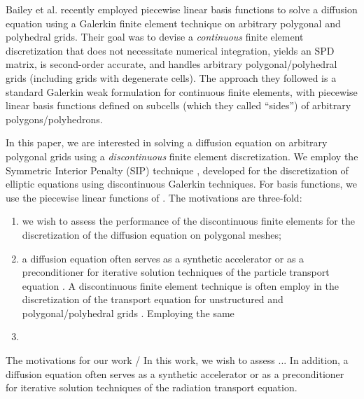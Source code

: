 \documentclass[preprint,10pt]{elsarticle}
\renewcommand{\(}{\left(}
\renewcommand{\)}{\right)}
\renewcommand{\[}{\left[}
\renewcommand{\]}{\right]}
\begin{document}
%
%
Bailey et al. \cite{BaileyAdams2008} recently employed piecewise linear basis
functions to solve a diffusion equation using a Galerkin finite element technique on 
arbitrary polygonal and polyhedral grids. Their goal was to devise a {\em continuous} finite 
element discretization that does not necessitate numerical integration, yields an SPD matrix, 
is second-order accurate, and handles arbitrary polygonal/polyhedral grids (including 
grids with degenerate cells). The approach they followed is a standard Galerkin weak 
formulation for continuous finite elements, with piecewise linear basis functions 
defined on subcells (which they called ``sides'') of arbitrary polygons/polyhedrons.

In this paper, we are interested in solving a diffusion equation on arbitrary polygonal
grids using a {\em discontinuous} finite element discretization. We employ the
Symmetric Interior Penalty (SIP) technique \cite{IPRefs}, developed for the discretization
of elliptic equations using discontinuous Galerkin techniques. For basis functions,
we use the piecewise linear functions of \cite{BaileyAdams2008}.
The motivations are three-fold: 
\begin{enumerate}
\item we wish to assess the performance of the discontinuous finite elements for 
the discretization of the diffusion equation on polygonal meshes;
\item a diffusion equation often serves as a synthetic accelerator or as a
preconditioner for iterative solution techniques of the particle transport equation
\cite{AdamsLarsen2002}. A discontinuous finite element technique is often employ
in the discretization of the transport equation for unstructured and 
polygonal/polyhedral grids \cite{MorelWarsaWareing,PWLD,CFEM-PWDL-Warsa,WangRagusa}.
Employing the same    
\item 
\end{enumerate}
The motivations for our work / In this work, we wish to assess ... In addition,
a diffusion equation often serves as a synthetic accelerator or as a
preconditioner \cite{AdamsLarsen2002} for iterative solution techniques of the 
radiation transport equation.
\end{document}
